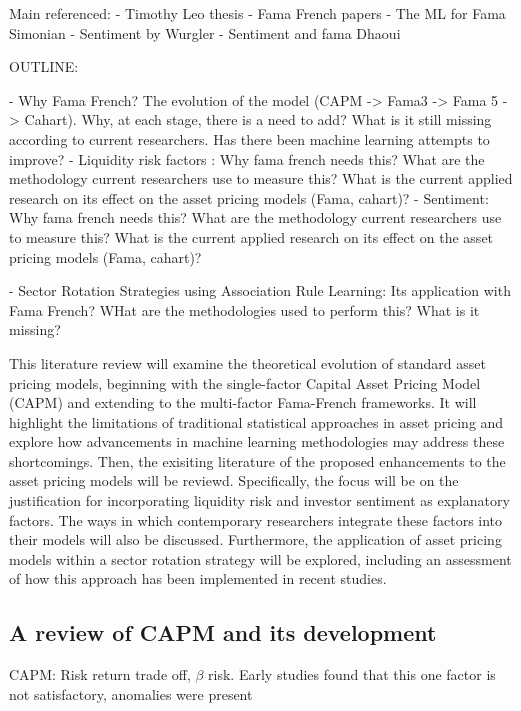 Main referenced:
- Timothy Leo thesis
- Fama French papers
- The ML for Fama Simonian
- Sentiment by Wurgler 
- Sentiment and fama Dhaoui

OUTLINE: 

- Why Fama French? The evolution of the model (CAPM -> Fama3 -> Fama 5 -> Cahart). Why, at each stage, there is a need to add? What is it still missing according to current researchers. Has there been machine learning attempts to improve?
- Liquidity risk factors : Why fama french needs this? What are the methodology current researchers use to measure this? What is the current applied research on its effect on the asset pricing models (Fama, cahart)?
- Sentiment: Why fama french needs this? What are the methodology current researchers use to measure this? What is the current applied research on its effect on the asset pricing models (Fama, cahart)?

- Sector Rotation Strategies using Association Rule Learning: Its application with Fama French? WHat are the methodologies used to perform this? What is it missing? 

This literature review will examine the theoretical evolution of standard asset pricing models, beginning with the single-factor Capital Asset Pricing Model (CAPM) and extending to the multi-factor Fama-French frameworks. It will highlight the limitations of traditional statistical approaches in asset pricing and explore how advancements in machine learning methodologies may address these shortcomings. Then, the exisiting literature of the proposed enhancements to the asset pricing models will be reviewd. Specifically, the focus will be on the justification for incorporating liquidity risk and investor sentiment as explanatory factors. The ways in which contemporary researchers integrate these factors into their models will also be discussed. Furthermore, the application of asset pricing models within a sector rotation strategy will be explored, including an assessment of how this approach has been implemented in recent studies.


\subsection{A review of CAPM and its development}
CAPM: Risk return trade off, $\beta$ risk. Early studies found that this one factor is not satisfactory, anomalies were present

